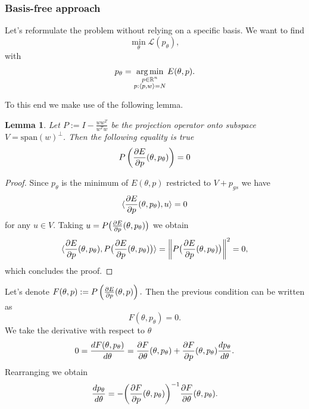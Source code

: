 \documentclass[a4paper,10.5pt]{report}
\newtheorem{lemma}{Lemma}
\begin{document}
\subsubsection{Basis-free approach}
Let's reformulate the problem without relying on a specific basis.
We want to find
\begin{equation}
 \min_\theta \mathcal{L}(p_\theta),
\end{equation}
with
\begin{equation}
p_\theta = \operatorname*{arg\,min}_{\substack{p \in \mathbb{R}^n \\ p: \langle p, w\rangle=N }} E(\theta, p).
\end{equation}


 To this end we make use of the following lemma.

\begin{lemma}
 Let $P := I -\frac{ww^T}{w^Tw} $ be the projection operator onto subspace $V = \text{span}(w)^{\perp}$. Then the following equality is true
 \begin{equation}
  P\left(\frac{\partial E}{\partial p}(\theta, p_\theta)\right) = 0
 \end{equation}

\end{lemma}
\begin{proof}
  Since $p_\theta$ is the minimum of $E(\theta,p)$ restricted to $V+p_{gs}$ we have \[\langle \frac{\partial E}{\partial p}(\theta,p_{\theta}), u \rangle = 0\] for any $u\in V$. Taking $u = P\big( \frac{\partial E}{\partial p}(\theta,p_\theta)\big)$ we obtain
  \[\langle \frac{\partial E}{\partial p}(\theta,p_{\theta}), P\big( \frac{\partial E}{\partial p}(\theta,p_\theta)\big) \rangle = \left\|P\big( \frac{\partial E}{\partial p}(\theta,p_\theta)\big)\right\|^2=0,\]
  which concludes the proof.
\end{proof}

Let's denote $F(\theta,p) :=P \left(\frac{\partial E}{\partial p}(\theta,p)\right).$ Then the previous condition can be written as
\begin{equation}
 F(\theta,p_\theta) = 0.
\end{equation}
We take the derivative with respect to $\theta$
\begin{equation}
0=\frac{dF(\theta, p_\theta)}{d \theta} = \frac{\partial F}{\partial \theta}(\theta,p_\theta) + \frac{\partial F}{\partial p}(\theta,p_\theta) \frac{dp_\theta}{d \theta}.
\end{equation}
Rearranging we obtain
\begin{equation}
 \frac{d p_\theta}{d\theta} = - \bigg(\frac{\partial F}{\partial p}(\theta,p_\theta)\bigg)^{-1} \frac{\partial F}{\partial \theta}(\theta,p_\theta).
\end{equation}
\end{document}
